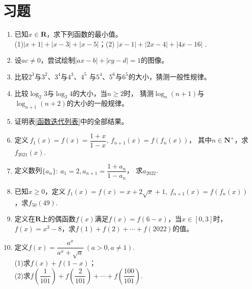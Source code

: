 \section{习题} 
\begin{enumerate}[label={\textbf{\arabic*.}},leftmargin=
    \inteval{\myenumleftmargin}pt]
\item  已知$ x\in \textbf{R} $，求下列函数的最小值。\\
(1)$ |x+1|+|x-3|+|x-5| $；\quad (2) $ |x-1|+|2x-4|+|4x-16| $ .

\item 设$ ac\neq 0 $，尝试绘制$ |ax-b|+|cy-d|=1 $的图像。

\item 比较$ 2^3 $与$ 3^2 $、$ 3^4 $与$ 4^3 $、$ 4^5 $
与$ 5^4 $、$ 5^6 $与$ 6^5 $的大小，猜测一般性规律。

\item 比较$ \log_2 3 $与$ \log_3 4 $的大小，当$ n\geq 2 $时，
猜测$ \log_n (n+1) $与$ \log_{n+1} (n+2) $的大小的一般规律。

\item 证明表\ref{函数迭代列表}中的全部结果。

\item 定义$\ f_1(x)=f(x)=\dfrac{1+x}{1-x},\ f_{n+1}(x)=f(f_n(x)) $，
其中$ n \in \textbf{N}^+ $，求$ f_{2021}(x) $. 

\item 定义数列$ \{a_n\}:\ a_1=2,a_{n+1}=\dfrac{1+a_n}{1-a_n} $，
求$ a_{2022} $. 

\item 已知$ x\geq 0 $，定义$\ f_1(x)=f(x)=x+2\sqrt{x}+1,\ f_{n+1}(x)=
f(f_n(x)) $，求$ f_{50}(49) $. 

\item 定义在$ \textbf{R} $上的偶函数$ f(x) $满足$ f(x)=f(6-x) $，当$ x\in [0,3] $时，
$ f(x)=x^3-8 $，求$ f(1)+f(2)+\cdots +f(2022) $的值。

\item 定义$ f(x)=\dfrac{a^x}{a^x+\sqrt{a}} \ (a>0,a\neq 1)$. \\
(1)求$ f(x)+f(1-x) $；\\
(2)求$ f\left(\dfrac{1}{101}\right)+f\left(\dfrac{2}{101}\right)+
\cdots +f\left(\dfrac{100}{101}\right) $. 


\end{enumerate}
